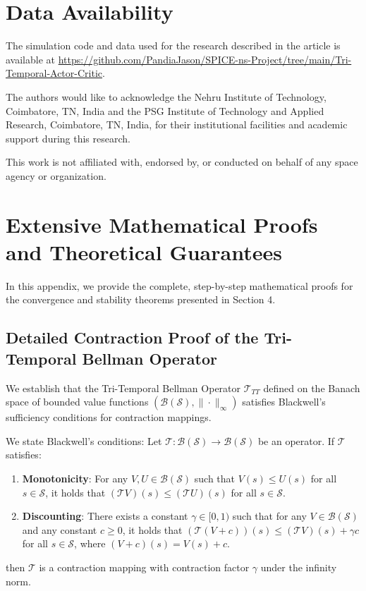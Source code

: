 \documentclass[manuscript, screen, review]{jair}
\begin{document}
\section*{Data Availability}
The simulation code and data used for the research described in the article is available at \url{https://github.com/PandiaJason/SPICE-ns-Project/tree/main/Tri-Temporal-Actor-Critic}.

\begin{acks}
The authors would like to acknowledge the Nehru Institute of Technology, Coimbatore, TN, India and the PSG Institute of Technology and Applied Research, Coimbatore, TN, India, for their institutional facilities and academic support during this research.

This work is not affiliated with, endorsed by, or conducted on behalf of any space agency or organization.
\end{acks}

\printbibliography

\appendix

\section{Extensive Mathematical Proofs and Theoretical Guarantees}\label{app:sec_proofs}
In this appendix, we provide the complete, step-by-step mathematical proofs for the convergence and stability theorems presented in Section 4.

\subsection{Detailed Contraction Proof of the Tri-Temporal Bellman Operator}\label{app:sub_contraction}
We establish that the Tri-Temporal Bellman Operator $\mathcal{T}_{TT}$ defined on the Banach space of bounded value functions $(\mathcal{B}(\mathcal{S}), \|\cdot\|_\infty)$ satisfies Blackwell's sufficiency conditions for contraction mappings.

We state Blackwell's conditions:
Let $\mathcal{T}: \mathcal{B}(\mathcal{S}) \to \mathcal{B}(\mathcal{S})$ be an operator. If $\mathcal{T}$ satisfies:
\begin{enumerate}
    \item \textbf{Monotonicity}: For any $V, U \in \mathcal{B}(\mathcal{S})$ such that $V(s) \le U(s)$ for all $s \in \mathcal{S}$, it holds that $(\mathcal{T} V)(s) \le (\mathcal{T} U)(s)$ for all $s \in \mathcal{S}$.
    \item \textbf{Discounting}: There exists a constant $\gamma \in [0, 1)$ such that for any $V \in \mathcal{B}(\mathcal{S})$ and any constant $c \ge 0$, it holds that $(\mathcal{T} (V + c))(s) \le (\mathcal{T} V)(s) + \gamma c$ for all $s \in \mathcal{S}$, where $(V+c)(s) = V(s) + c$.
\end{enumerate}
then $\mathcal{T}$ is a contraction mapping with contraction factor $\gamma$ under the infinity norm.
\end{document}
